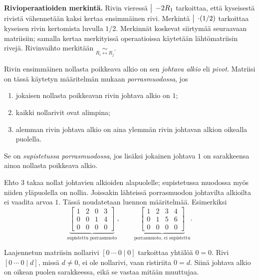\documentclass[11pt,a4paper]{amsart}
\begin{document}
  \noindent\textbf{Rivioperaatioiden merkintä.}
  Rivin vieressä $\mathrel{\big|}\,-2R_1$ tarkoittaa, että kyseisestä rivistä
  vähennetään kaksi kertaa ensimmäinen rivi. Merkintä
  $\mathrel{\big|}\,\cdot(1/2)$ tarkoittaa kyseisen rivin kertomista luvulla $1/2$.
  Merkinnät koskevat siirtymää seuraavaan matriisiin; samalla kertaa
  merkityissä operaatioissa käytetään lähtömatriisin rivejä.
  Rivinvaihto merkitään $\underset{R_i\leftrightarrow R_j}{\sim}$.

  \begin{definition}[Porrasmuoto]
    Rivin ensimmäinen nollasta poikkeava alkio on sen \emph{johtava alkio}
    eli \emph{pivot}. Matriisi on tässä käytetyn määritelmän mukaan
    \emph{porrasmuodossa}, jos
    \begin{enumerate}
      \item jokaisen nollasta poikkeavan rivin johtava alkio on $1$;
      \item kaikki nollarivit ovat alimpina;
      \item alemman rivin johtava alkio on aina ylemmän rivin johtavan
        alkion oikealla puolella.
    \end{enumerate}
    Se on \emph{supistetussa porrasmuodossa}, jos lisäksi jokainen
    johtava $1$ on sarakkeensa ainoa nollasta poikkeava alkio.
  \end{definition}

  Ehto 3 takaa nollat johtavien alkioiden alapuolelle; supistetussa
  muodossa myös niiden yläpuolella on nollia. Joissakin lähteissä
  porrasmuodon johtavilta alkioilta ei vaadita arvoa $1$. Tässä
  noudatetaan luennon määritelmää.
  Esimerkiksi
  \[
    \underbrace{\left[
        \begin{array}{ccc|c}
          1&2&0&3\\0&0&1&4\\0&0&0&0
    \end{array}\right]}_{\text{supistettu porrasmuoto}},\qquad
    \underbrace{\left[
        \begin{array}{ccc|c}
          1&2&3&4\\0&1&5&6\\0&0&0&0
    \end{array}\right]}_{\text{porrasmuoto, ei supistettu}}.
  \]

  \begin{remark}
    Laajennetun matriisin nollarivi $[0\ \cdots\ 0\mid0]$ tarkoittaa
    yhtälöä $0=0$. Rivi $[0\ \cdots\ 0\mid d]$, missä $d\ne0$,
    ei ole nollarivi, vaan ristiriita $0=d$. Siinä johtava alkio on
    oikean puolen sarakkeessa, eikä se vastaa mitään muuttujaa.
  \end{remark}
\end{document}
